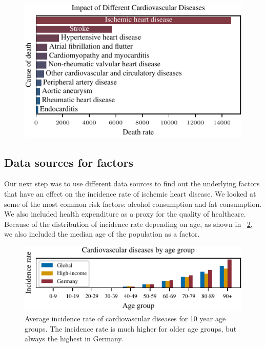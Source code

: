 \begin{figure}[ht]
    \vskip 0.2in
    \begin{center}
    \centerline{\includegraphics[width=\columnwidth]{fig/fig_ImpactOfDifferentCVDs.pdf}}
    \caption{}
    \label{Impact of Different CVDs}
    \end{center}
    \vskip -0.2in
\end{figure}

\subsection{Data sources for factors}\label{sec:data_sources}
Our next step was to use different data sources to find out the underlying factors that have an effect on the incidence rate of ischemic heart disease. We looked at some of 
the most common risk factors: alcohol consumption and fat consumption. We also included health expenditure as a proxy for the quality of healthcare. Because of the 
distribution of incidence rate depending on age, as shown in \figurename~\ref{Cardiovascular diseases for age groups}, we also included the median age of the population as a 
factor.

\begin{figure}[ht]
\vskip 0.2in
\begin{center}
\centerline{\includegraphics[width=\columnwidth]{fig/fig_cardiovascular_disease_agerange.pdf}}
\caption{Average incidence rate of cardiovascular diseases for 10 year age groups. The incidence rate is much higher for older age groups, but 
always the highest in Germany.}
\label{Cardiovascular diseases for age groups}
\end{center}
\vskip -0.2in
\end{figure}

